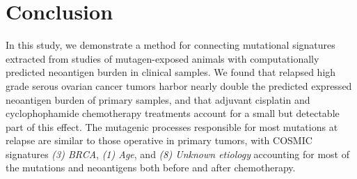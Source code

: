 \section*{Conclusion}
In this study, we demonstrate a method for connecting mutational signatures extracted from studies of mutagen-exposed animals with computationally predicted neoantigen burden in clinical samples. We found that relapsed high grade serous ovarian cancer tumors harbor nearly double the predicted expressed neoantigen burden of primary samples, and that adjuvant cisplatin and cyclophophamide chemotherapy treatments account for a small but detectable part of this effect. The mutagenic processes responsible for most mutations at relapse are similar to those operative in primary tumors, with COSMIC signatures \textit{(3) BRCA}, \textit{(1) Age}, and \textit{(8) Unknown etiology} accounting for most of the mutations and neoantigens both before and after chemotherapy.